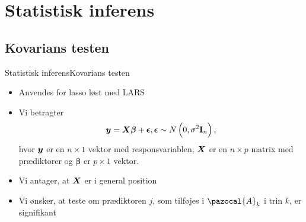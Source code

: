 \section{Statistisk inferens}
\subsection{Kovarians testen}
\begin{frame}{Statistisk inferens}{Kovarians testen}
\begin{itemize}
\item Anvendes for lasso løst med LARS
\item Vi betragter 
\begin{align*}
\vy = \vX \boldsymbol \beta + \boldsymbol \epsilon, \boldsymbol \epsilon \sim N\del{0, \sigma^2 \textbf{I}_n},
\end{align*}
hvor $\bm{y}$ er en $n \times 1$ vektor med responsvariablen, $\bm{X}$ er en $n \times p$ matrix med prædiktorer og $\boldsymbol \beta$ er $p \times 1$ vektor.
\item Vi antager, at $\bm{X}$ er i general position
\item Vi ønsker, at teste om prædiktoren $j$, som tilføjes i $\pazocal{A}_k$ i trin $k$, er signifikant
\end{itemize}
\end{frame}

